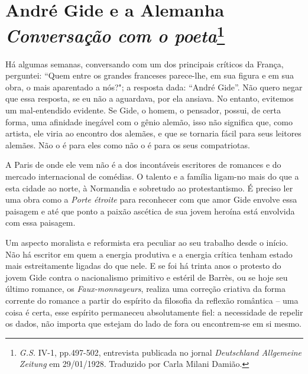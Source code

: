 \chapter{André Gide e a Alemanha\\
\emph{Conversação com o poeta}\footnote[*]{\emph{G.S.} IV-1,
  pp.497-502, entrevista publicada no jornal \emph{Deutschland
  Allgemeine Zeitung} em 29/01/1928. Traduzido por Carla Milani Damião.}}


Há algumas semanas, conversando com um dos principais críticos da
França, perguntei: ``Quem entre os grandes franceses parece-lhe, em sua
figura e em sua obra, o mais aparentado a nós?"; a resposta dada:
``André Gide''. Não quero negar que essa resposta, se eu não a
aguardava, por ela ansiava. No entanto, evitemos um mal-entendido
evidente. Se Gide, o homem, o pensador, possui, de certa forma, uma
afinidade inegável com o gênio alemão, isso não significa que, como
artista, ele viria ao encontro dos alemães, e que se tornaria fácil para
seus leitores alemães. Não o é para eles como não o é para os seus
compatriotas.

A Paris de onde ele vem não é a dos incontáveis ​​escritores de romances
e do mercado internacional de comédias. O talento e a família ligam-no
mais do que a esta cidade ao norte, à Normandia e sobretudo ao
protestantismo. É preciso ler uma obra como a \emph{Porte étroite} para
reconhecer com que amor Gide envolve essa paisagem e até que ponto a
paixão ascética de sua jovem heroína está envolvida com essa paisagem.

Um aspecto moralista e reformista era peculiar ao seu trabalho desde o
início. Não há escritor em quem a energia produtiva e a energia crítica
tenham estado mais estreitamente ligadas do que nele. E se foi há trinta
anos o protesto do jovem Gide contra o nacionalismo primitivo e estéril
de Barrès, ou se hoje seu último romance, os \emph{Faux-monnayeurs},
realiza uma correção criativa da forma corrente do romance a partir do
espírito da filosofia da reflexão romântica -- uma coisa é certa, esse
espírito permaneceu absolutamente fiel: a necessidade de repelir os
dados, não importa que estejam do lado de fora ou encontrem-se em si
mesmo.


